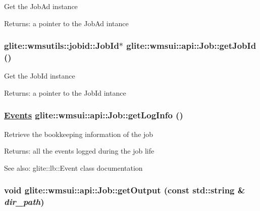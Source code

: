 Get the Job\-Ad instance \begin{Desc}
\item[Returns:]a pointer to the Job\-Ad intance \end{Desc}
\hypertarget{classglite_1_1wmsui_1_1api_1_1Job_z17_0}{
\subsubsection[getJobId]{\setlength{\rightskip}{0pt plus 5cm}glite::wmsutils::jobid::Job\-Id$\ast$ glite::wmsui::api::Job::get\-Job\-Id ()}}
\label{classglite_1_1wmsui_1_1api_1_1Job_z17_0}


Get the Job\-Id instance \begin{Desc}
\item[Returns:]a pointer to the Job\-Id intance \end{Desc}
\hypertarget{classglite_1_1wmsui_1_1api_1_1Job_z21_1}{
\subsubsection[getLogInfo]{\setlength{\rightskip}{0pt plus 5cm}\hyperlink{namespaceglite_1_1wmsui_1_1api_a23}{Events} glite::wmsui::api::Job::get\-Log\-Info ()}}
\label{classglite_1_1wmsui_1_1api_1_1Job_z21_1}


Retrieve the bookkeeping information of the job \begin{Desc}
\item[Returns:]all the events logged during the job life \end{Desc}
\begin{Desc}
\item[See also:]glite::lb::Event class documentation \end{Desc}
\hypertarget{classglite_1_1wmsui_1_1api_1_1Job_z23_4}{
\subsubsection[getOutput]{\setlength{\rightskip}{0pt plus 5cm}void glite::wmsui::api::Job::get\-Output (const std::string \& {\em dir\_\-path})}}
\label{classglite_1_1wmsui_1_1api_1_1Job_z23_4}


